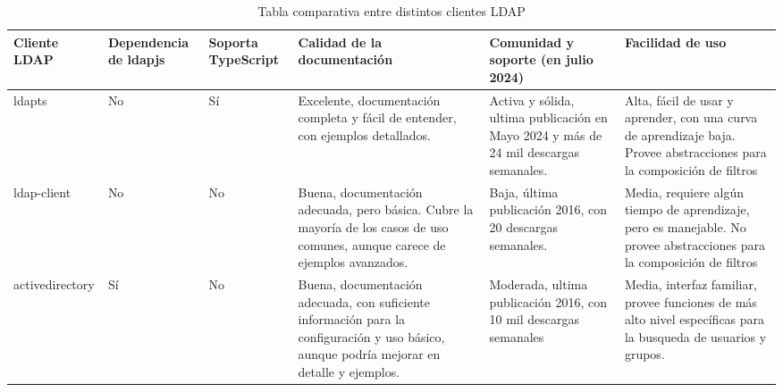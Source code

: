 \begin{landscape}
    \begin{longtable}{|l|p{3cm}|p{2.5cm}|p{6cm}|p{5cm}|p{6cm}|}
        \caption{Tabla comparativa entre distintos clientes LDAP}
        \label{table:ldap-client-comparison}                                                                                                                                                                                                                                                                                                                                                                                                               \\
        \hline
        \textbf{Cliente LDAP} & \textbf{Dependencia de ldapjs} & \textbf{Soporta TypeScript} & \textbf{Calidad de la documentación}                                                                                                       & \textbf{Comunidad y soporte (en julio 2024)}                                          & \textbf{Facilidad de uso}                                                                                              \\
        \hline
        \endfirsthead
        ldapts                & No                             & Sí                          & Excelente, documentación completa y fácil de entender, con ejemplos detallados.                                                            & Activa y sólida, ultima publicación en Mayo 2024 y más de 24 mil descargas semanales. & Alta, fácil de usar y aprender, con una curva de aprendizaje baja. Provee abstracciones para la composición de filtros \\
        \hline
        ldap-client           & No                             & No                          & Buena, documentación adecuada, pero básica. Cubre la mayoría de los casos de uso comunes, aunque carece de ejemplos avanzados.             & Baja, última publicación 2016, con 20 descargas semanales.                            & Media, requiere algún tiempo de aprendizaje, pero es manejable. No provee abstracciones para la composición de filtros \\
        \hline
        activedirectory       & Sí                             & No                          & Buena, documentación adecuada, con suficiente información para la configuración y uso básico, aunque podría mejorar en detalle y ejemplos. & Moderada, ultima publicación 2016, con 10 mil descargas semanales                     & Media, interfaz familiar, provee funciones de más alto nivel  específicas  para la busqueda de usuarios y grupos.      \\

\end{longtable}
\end{landscape}
